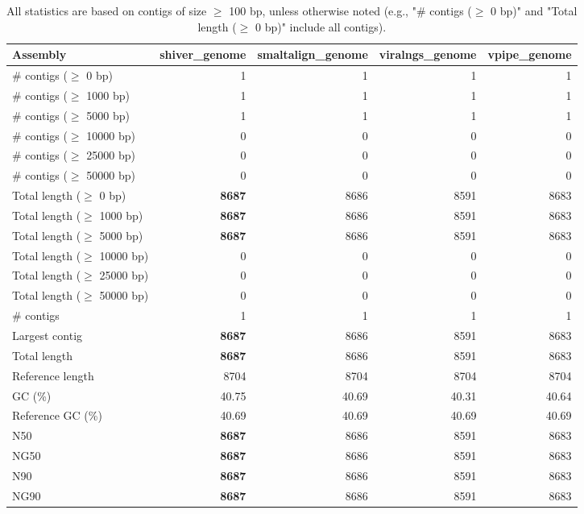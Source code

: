 \documentclass[12pt,a4paper]{article}
\begin{document}
\begin{table}[ht]
\begin{center}
\caption{All statistics are based on contigs of size $\geq$ 100 bp, unless otherwise noted (e.g., "\# contigs ($\geq$ 0 bp)" and "Total length ($\geq$ 0 bp)" include all contigs).}
\begin{tabular}{|l*{4}{|r}|}
\hline
Assembly & shiver\_genome & smaltalign\_genome & viralngs\_genome & vpipe\_genome \\ \hline
\# contigs ($\geq$ 0 bp) & 1 & 1 & 1 & 1 \\ \hline
\# contigs ($\geq$ 1000 bp) & 1 & 1 & 1 & 1 \\ \hline
\# contigs ($\geq$ 5000 bp) & 1 & 1 & 1 & 1 \\ \hline
\# contigs ($\geq$ 10000 bp) & 0 & 0 & 0 & 0 \\ \hline
\# contigs ($\geq$ 25000 bp) & 0 & 0 & 0 & 0 \\ \hline
\# contigs ($\geq$ 50000 bp) & 0 & 0 & 0 & 0 \\ \hline
Total length ($\geq$ 0 bp) & {\bf 8687} & 8686 & 8591 & 8683 \\ \hline
Total length ($\geq$ 1000 bp) & {\bf 8687} & 8686 & 8591 & 8683 \\ \hline
Total length ($\geq$ 5000 bp) & {\bf 8687} & 8686 & 8591 & 8683 \\ \hline
Total length ($\geq$ 10000 bp) & 0 & 0 & 0 & 0 \\ \hline
Total length ($\geq$ 25000 bp) & 0 & 0 & 0 & 0 \\ \hline
Total length ($\geq$ 50000 bp) & 0 & 0 & 0 & 0 \\ \hline
\# contigs & 1 & 1 & 1 & 1 \\ \hline
Largest contig & {\bf 8687} & 8686 & 8591 & 8683 \\ \hline
Total length & {\bf 8687} & 8686 & 8591 & 8683 \\ \hline
Reference length & 8704 & 8704 & 8704 & 8704 \\ \hline
GC (\%) & 40.75 & 40.69 & 40.31 & 40.64 \\ \hline
Reference GC (\%) & 40.69 & 40.69 & 40.69 & 40.69 \\ \hline
N50 & {\bf 8687} & 8686 & 8591 & 8683 \\ \hline
NG50 & {\bf 8687} & 8686 & 8591 & 8683 \\ \hline
N90 & {\bf 8687} & 8686 & 8591 & 8683 \\ \hline
NG90 & {\bf 8687} & 8686 & 8591 & 8683 \\ \hline

\end{tabular}
\end{center}
\end{table}
\end{document}
